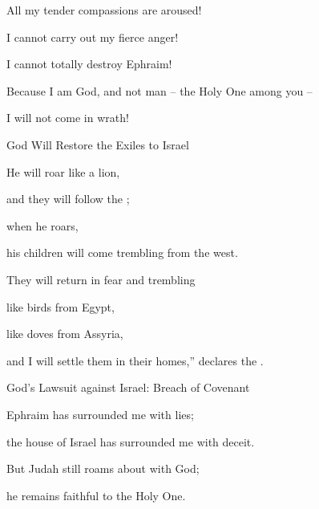 {\par }{\Q All
my tender compassions
are aroused!
\par }{\Q {}I cannot
carry
out my fierce
anger!
\par }{\Q I cannot
totally
destroy
Ephraim!
\par }{\Q Because
I am
God,
and not
man
– the Holy One
among you –
\par }{\Q I will not come in wrath!
\par }{\SH God Will Restore the Exiles to Israel
\par }{\Q {}He will roar
like a lion,
\par }{\Q and they will follow
the {};
\par }{\Q when
he
roars,
\par }{\Q his children
will come trembling
from the west.
\par }{\Q {}They will return in fear and trembling
\par }{\Q like birds
from Egypt,
\par }{\Q like doves
from Assyria,
\par }{\Q and I will settle
them in their homes,”
declares
the {}.
\par }{\SH God’s Lawsuit against Israel: Breach of Covenant
\par }{\Q {} Ephraim
has surrounded
me with lies;
\par }{\Q the house
of Israel
has surrounded me with deceit.
\par }{\Q But Judah
still
roams
about with
God;
\par }{\Q he remains faithful
to the Holy One.

}
